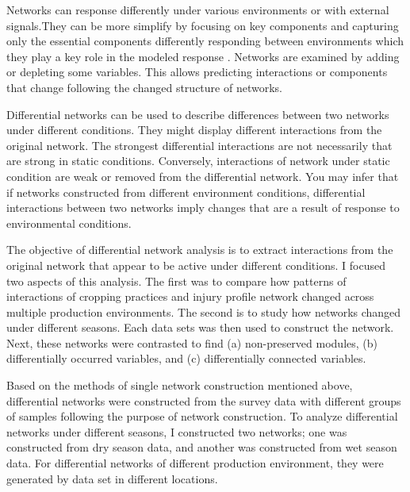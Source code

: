 Networks can response differently under various environments or with external signals.They can be more simplify by focusing on key components and capturing only the essential components differently responding between environments which they play a key role in the modeled response . Networks are examined by adding or depleting some variables. This allows predicting interactions or components that change following the changed structure of networks. 

Differential networks can be used to describe differences between two networks under different conditions. They might display different interactions from the original network. The strongest differential interactions are not necessarily that are strong in static conditions. Conversely, interactions of network under static condition are weak or removed from the differential network. You may infer that if networks constructed from different environment conditions, differential interactions between two networks imply changes that are a result of response to environmental conditions. 

The objective of differential network analysis is to extract interactions from the original network that appear to be active under different conditions. I focused two aspects of this analysis. The first was to compare how patterns of interactions of cropping practices and injury profile network changed across multiple production environments. The second is to study how networks changed under different seasons. Each data sets was then used to construct the network. Next, these networks were contrasted to find (a) non-preserved modules, (b) differentially occurred variables, and (c) differentially connected variables.

Based on the methods of single network construction mentioned above, differential networks were constructed from the survey data with different groups of samples following the purpose of network construction. To analyze differential networks under different seasons, I constructed two networks; one was constructed from dry season data, and another was constructed from wet season data. For differential networks of different production environment, they were generated by data set in different locations.

